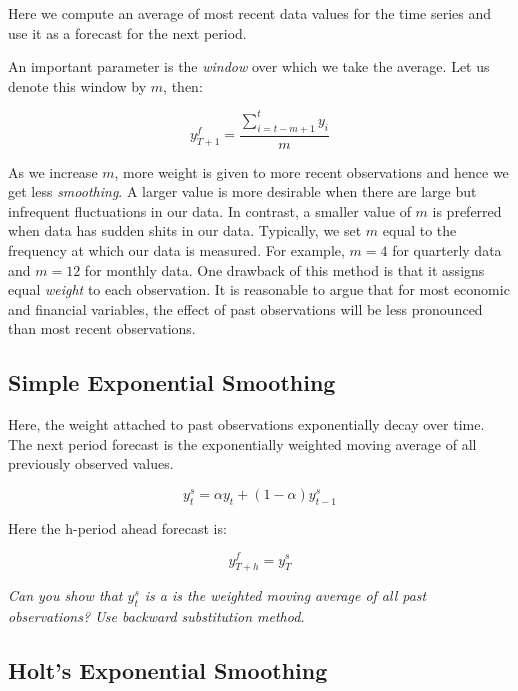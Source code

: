 \documentclass[]{book}
\theoremstyle{definition}
\theoremstyle{definition}
\theoremstyle{definition}
\theoremstyle{remark}
\begin{document}
Here we compute an average of most recent data values for the time
series and use it as a forecast for the next period.

An important parameter is the \emph{window} over which we take the
average. Let us denote this window by \(m\), then:

\begin{equation}
    y^f_{T+1}=\frac{\sum_{i=t-m+1}^{t}{y_i}}{m}
    \end{equation}

As we increase \(m\), more weight is given to more recent observations
and hence we get less \emph{smoothing}. A larger value is more desirable
when there are large but infrequent fluctuations in our data. In
contrast, a smaller value of \(m\) is preferred when data has sudden
shits in our data. Typically, we set \(m\) equal to the frequency at
which our data is measured. For example, \(m=4\) for quarterly data and
\(m=12\) for monthly data. One drawback of this method is that it
assigns equal \emph{weight} to each observation. It is reasonable to
argue that for most economic and financial variables, the effect of past
observations will be less pronounced than most recent observations.

\subsection{Simple Exponential
Smoothing}\label{simple-exponential-smoothing}

Here, the weight attached to past observations exponentially decay over
time. The next period forecast is the exponentially weighted moving
average of all previously observed values.

\begin{equation}
    y_{t}^{s}= \alpha y_t + (1-\alpha)y_{t-1}^{s}
 \end{equation}

Here the h-period ahead forecast is:

\begin{equation}
    y^f_{T+h} = y_T^s
    \end{equation}

\emph{Can you show that \(y_{t}^{s}\) is a is the weighted moving
average of all past observations? Use backward substitution method.}

\subsection{Holt's Exponential
Smoothing}\label{holts-exponential-smoothing}
\end{document}
